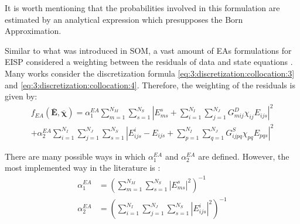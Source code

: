 			It is worth mentioning that the probabilities involved in this formulation are estimated by an analytical expression which presupposes the Born Approximation.
			
			Similar to what was introduced in SOM, a vast amount of EAs formulations for EISP considered a weighting between the residuals of data and state equations \citep{pastorino2010}. Many works consider the discretization formula \eqref{eq:3:discretization:collocation:3} and \eqref{eq:3:discretization:collocation:4}. Therefore, the weighting of the residuals is given by:
			\begin{multline}
				f_{EA}(\mathbf{\bar{E}},\boldsymbol{\bar{\chi}}) = \alpha^{EA}_1\sum\limits_{m=1}^{N_M}\sum\limits_{s=1}^{N_S} \left|E^s_{ms} + \sum\limits_{i=1}^{N_I}\sum\limits_{j=1}^{N_J} G^D_{mij}\chi_{ij}E_{ijs}\right|^2 \\ + \alpha^{EA}_2\sum\limits_{i=1}^{N_I}\sum\limits_{j=1}^{N_J}\sum\limits_{s=1}^{N_S}\left|E^i_{ijs}-E_{ijs} + \sum\limits_{p=1}^{N_I}\sum\limits_{q=1}^{N_J}G^S_{ijpq}\chi_{pq}E_{pqs}\right|^2 \label{eq:3:stochastic:objfun:0}
			\end{multline}
		
			There are many possible ways in which $\alpha^{EA}_1$ and $\alpha^{EA}_2$ are defined. However, the most implemented way in the literature is \citep{benedetti2007multicrack,caorsi2002iterative,caorsi2004detection,donelli2005computational,salucci2017multifrequency}:
			\begin{align}
				\alpha^{EA}_1 &= \left(\sum\limits_{m=1}^{N_M}\sum\limits_{s=1}^{N_S} \left|E^s_{ms}\right|^2\right)^{-1} \label{eq:3:stochastic:objfun:1} \\
				\alpha^{EA}_2 &= \left(\sum\limits_{i=1}^{N_I}\sum\limits_{j=1}^{N_J}\sum\limits_{s=1}^{N_S} \left|E^i_{ijs}\right|^2\right)^{-1} \label{eq:3:stochastic:objfun:2}
			\end{align}
		
